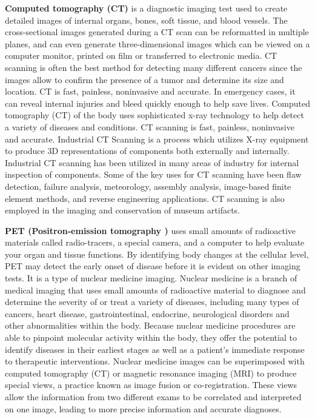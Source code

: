 \textbf{  Computed tomography (CT) } is a diagnostic imaging test used to create detailed images of internal organs, bones, soft tissue, and blood vessels. The cross-sectional images generated during a CT scan can be reformatted in multiple planes, and can even generate three-dimensional images which can be viewed on a computer monitor, printed on film or transferred to electronic media. CT scanning is often the best method for detecting many different cancers since the images allow to confirm the presence of a tumor and determine its size and location. CT is fast, painless, noninvasive and accurate. In emergency cases, it can reveal internal injuries and bleed quickly enough to help save lives. \newline Computed tomography (CT) of the body uses sophisticated x-ray technology to help detect a variety of diseases and conditions. CT scanning is fast, painless, noninvasive and accurate.  Industrial CT Scanning is a process which utilizes X-ray equipment to produce 3D representations of components both externally and internally. Industrial CT scanning has been utilized in many areas of industry for internal inspection of components. Some of the key uses for CT scanning have been flaw detection, failure analysis, meteorology, assembly analysis, image-based finite element methods, and reverse engineering applications. CT scanning is also employed in the imaging and conservation of museum artifacts.


 \textbf{PET (Positron-emission tomography ) } uses small amounts of radioactive materials called radio-tracers, a special camera, and a computer to help evaluate your organ and tissue functions. By identifying body changes at the cellular level, PET may detect the early onset of disease before it is evident on other imaging tests. It is a type of nuclear medicine imaging. Nuclear medicine is a branch of medical imaging that uses small amounts of radioactive material to diagnose and determine the severity of or treat a variety of diseases, including many types of cancers, heart disease, gastrointestinal, endocrine, neurological disorders and other abnormalities within the body. Because nuclear medicine procedures are able to pinpoint molecular activity within the body, they offer the potential to identify diseases in their earliest stages as well as a patient's immediate response to therapeutic interventions. Nuclear medicine images can be superimposed with computed tomography (CT) or magnetic resonance imaging (MRI) to produce special views, a practice known as image fusion or co-registration. These views allow the information from two different exams to be correlated and interpreted on one image, leading to more precise information and accurate diagnoses.


